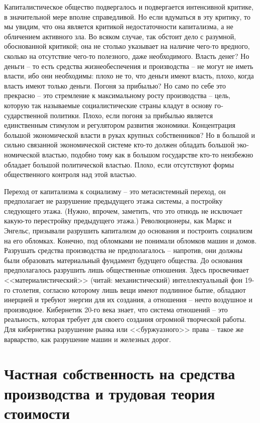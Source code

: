 \documentclass{book}
\begin{document}
Капиталистическое общество подвергалось и подвергается интенсивной критике, в значительной мере вполне справедли­вой. Но если вдуматься в эту критику, то мы увидим, что она является критикой недостаточности капитализма,  а не обличе­нием активного зла. Во всяком случае, так обстоит дело с ра­зумной, обоснованной критикой; она не столько указывает на наличие чего-то вредного, сколько на отсутствие чего-то полезного, даже необходимого. Власть денег? Но деньги -- то есть средства жизнеобеспечения и производства -- не могут не иметь власти, ибо они необходимы: плохо не то, что деньги имеют власть, плохо, когда власть имеют только  деньги. По­гоня за прибылью? Но само по себе это прекрасно -- это стрем­ление к максимальному росту производства -- цель, которую так называемые социалистические страны кладут в основу го­сударственной политики. Плохо, если погоня за прибылью яв­ляется единственным  стимулом и регулятором развития эко­номики. Концентрация большой экономической власти в руках крупных собственников? Но в 
большой и сильно связанной экономической системе кто-то должен обладать большой эко­номической властью, подобно тому как в большом государст­ве кто-то неизбежно обладает большой политической властью. Плохо, если отсутствуют формы общественного контроля  над этой властью.

Переход от капитализма к социализму -- это метасистемный переход, он предполагает не разрушение предыдущего этажа системы, а постройку следующего этажа. (Нужно, впрочем, заметить, что это отнюдь не исключает какую-то перестройку предыдущего этажа.) Революционеры, как Маркс и Энгельс, призывали разрушить капитализм до основания и построить социализм на его обломках. Конечно, под обломками не пони­мали обломков машин и домов. Разрушать средства произ­водства не предполагалось -- напротив, они должны были обра­зовать материальный фундамент будущего общества. До осно­вания  предполагалось разрушить лишь общественные отно­шения. Здесь просвечивает <<материалистический>> (читай: меха­нистический) интеллектуальный фон 19-го столетия, согласно которому лишь вещи имеют подлинное бытие, обладают инер­цией и требуют энергии для их создания, а отношения -- нечто воздушное и производное. Кибернетик 20-го века знает, что система отношений -- это реальность, которая требует для своего создания огромной творческой работы. Для 
кибернетика раз­рушение рынка или <<буржуазного>> права -- такое же варварст­во, как разрушение машин и железных дорог.



\section{Частная собственность на средства производства и трудовая теория стоимости}
\end{document}
